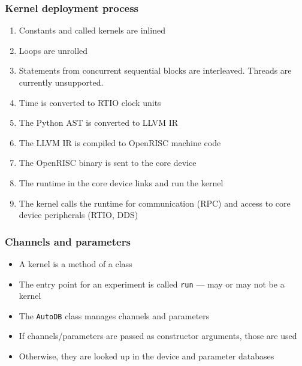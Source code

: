\documentclass{beamer}
\begin{document}
\begin{frame}
\frametitle{\selectfont Kernel deployment process}
\begin{enumerate}
\item Constants and called kernels are inlined
\item Loops are unrolled
\item Statements from concurrent sequential blocks are interleaved. Threads are currently unsupported.
\item Time is converted to RTIO clock units
\item The Python AST is converted to LLVM IR
\item The LLVM IR is compiled to OpenRISC machine code
\item The OpenRISC binary is sent to the core device
\item The runtime in the core device links and run the kernel
\item The kernel calls the runtime for communication (RPC) and access to core device peripherals (RTIO, DDS)
\end{enumerate}
\end{frame}

\begin{frame}[fragile]
\frametitle{\selectfont Channels and parameters}
\begin{itemize}
\item A kernel is a method of a class
\item The entry point for an experiment is called \verb!run! --- may or may not be a kernel
\item The \verb!AutoDB! class manages channels and parameters
\item If channels/parameters are passed as constructor arguments, those are used
\item Otherwise, they are looked up in the device and parameter databases
\end{itemize}
\end{frame}
\end{document}
